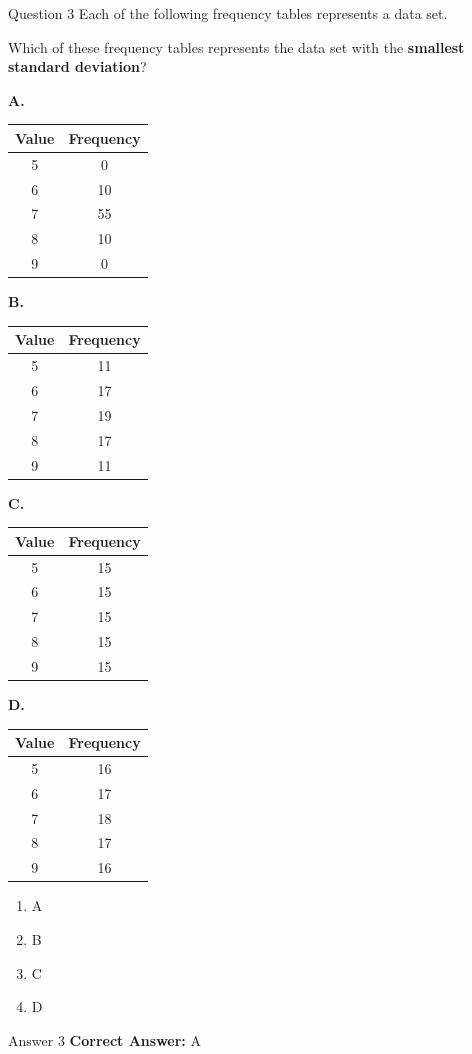 \documentclass{beamer}
\begin{document}
\begin{frame}{Question 3}
\small
Each of the following frequency tables represents a data set.

Which of these frequency tables represents the data set with the \textbf{smallest standard deviation}?

\textbf{A.}
\begin{tabular}{|c|c|}
\hline
Value & Frequency \\
\hline
5 & 0 \\
6 & 10 \\
7 & 55 \\
8 & 10 \\
9 & 0 \\
\hline
\end{tabular}

\textbf{B.}
\begin{tabular}{|c|c|}
\hline
Value & Frequency \\
\hline
5 & 11 \\
6 & 17 \\
7 & 19 \\
8 & 17 \\
9 & 11 \\
\hline
\end{tabular}

\textbf{C.}
\begin{tabular}{|c|c|}
\hline
Value & Frequency \\
\hline
5 & 15 \\
6 & 15 \\
7 & 15 \\
8 & 15 \\
9 & 15 \\
\hline
\end{tabular}

\textbf{D.}
\begin{tabular}{|c|c|}
\hline
Value & Frequency \\
\hline
5 & 16 \\
6 & 17 \\
7 & 18 \\
8 & 17 \\
9 & 16 \\
\hline
\end{tabular}
\vspace{0.35cm}
\begin{enumerate}
    \item[A.] A
    \item[B.] B
    \item[C.] C
    \item[D.] D
\end{enumerate}
\end{frame}
\begin{frame}{Answer 3}
\small
\textbf{Correct Answer:} A
\end{frame}
\end{document}

